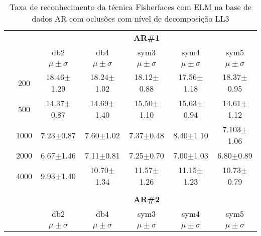 







%
%

\begin{table}[H]
	\centering
    \normalsize
	\caption{Taxa de reconhecimento da técnica Fisherfaces  com ELM na base de dados AR com oclusões com nível de decomposição LL3}
	\begin{tabular}{|c|c|c c c c c|}
\cline{3-7}
\multicolumn{2}{c|}{\multirow{3}{*}{}} & \multicolumn{5}{c|}{\textbf{AR\#1}}   \\\cline{3-7} 
\multicolumn{2}{c|}{}  & db2 & db4 & sym3 & sym4 & sym5 \\\cline{3-7}%
\multicolumn{2}{c|}{}& $\mu \pm \sigma$ & $\mu \pm \sigma$ & $\mu \pm \sigma$ & $\mu \pm \sigma$ & $\mu \pm \sigma$ \\\hline


\multicolumn{1}{|c|}{ \multirow{5}{*}{\rotatebox[origin=c]{90}{\textbf{Neurônios}}} }
&200	&18.46$\pm$1.29	&18.24$\pm$1.02	&18.12$\pm$0.88	&17.56$\pm$1.18	&18.37$\pm$0.95	\\\cline{2-7}
&500	&14.37$\pm$0.87	&14.69$\pm$1.40	&15.50$\pm$1.10	&15.63$\pm$0.94	&14.61$\pm$1.12	\\\cline{2-7}
&1000	&7.23$\pm$0.87	&7.60$\pm$1.02	&7.37$\pm$0.48	&8.40$\pm$1.10	&7.103$\pm$1.06	\\\cline{2-7}
&2000	&6.67$\pm$1.46	&7.11$\pm$0.81	&7.25$\pm$0.70	&7.00$\pm$1.03	&6.80$\pm$0.89	\\\cline{2-7}
&4000	&9.93$\pm$1.40	&10.70$\pm$1.34	&11.57$\pm$1.26	&11.15$\pm$1.23	&10.73$\pm$0.79	



\\\midrule%

\multicolumn{7}{c}{}\\ 

\cline{3-7}
\multicolumn{2}{c|}{\multirow{3}{*}{}} & \multicolumn{5}{c|}{\textbf{AR\#2}}   \\\cline{3-7} 

\multicolumn{2}{c|}{}  & db2 & db4 & sym3 & sym4 & sym5 \\\cline{3-7}
\multicolumn{2}{c|}{}& $\mu \pm \sigma$ & $\mu \pm \sigma$ & $\mu \pm \sigma$ & $\mu \pm \sigma$ & $\mu \pm \sigma$ \\\hline



\end{tabular}
\end{table}
